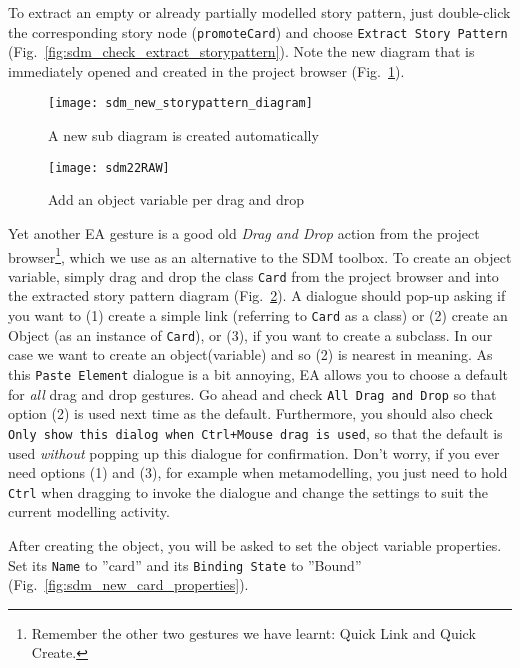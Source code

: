 To extract an empty or already partially modelled story pattern, just double-click the corresponding story node (\texttt{promoteCard}) and choose
\texttt{Extract Story Pattern} (Fig.~\ref{fig:sdm_check_extract_storypattern}). Note the new diagram that is immediately opened and created in the project
browser (Fig.~\ref{fig:sdm_new_sub_diagram}).

\begin{figure}[htbp]
\begin{center}
  \texttt{[image: sdm\_new\_storypattern\_diagram]}
  \caption{A new sub diagram is created automatically}
  \label{fig:sdm_new_sub_diagram}
\end{center}
\end{figure}

\begin{figure}[htbp]
\begin{center}
  \texttt{[image: sdm22RAW]}
  \caption{Add an object variable per drag and drop}
  \label{fig:sdm_check_bound_card}
\end{center}
\end{figure}

Yet another EA gesture is a good old \emph{Drag and Drop} action from the project browser\footnote{Remember the other two gestures we have learnt:
Quick Link and Quick Create.}, which we use as an alternative to the SDM toolbox. To create an object variable, simply drag and drop the class \texttt{Card}
from the project browser and into the extracted story pattern diagram (Fig.~\ref{fig:sdm_check_bound_card}).  A dialogue should pop-up asking if you want to (1)
create a simple link (referring to \texttt{Card} as a class) or (2) create an Object (as an instance of \texttt{Card}), or (3), if you want to create a
subclass. In our case we want to create an object(variable) and so (2) is nearest in meaning. As this \texttt{Paste Element} dialogue is a bit annoying, EA 
allows you to choose a default for \emph{all} drag and drop gestures. Go ahead and check \texttt{All Drag and Drop} so that option (2) is used next time as the
default.  Furthermore, you should also check \texttt{Only show this dialog when Ctrl+Mouse drag is used}, so that the default is used \emph{without} popping up
this dialogue for confirmation. Don't worry, if you ever need options (1) and (3), for example when metamodelling, you  just need to hold \texttt{Ctrl} when
dragging to invoke the dialogue and change  the settings to suit the current modelling activity.

After creating the object, you will be asked to set the object variable properties. Set its \texttt{Name} to ''card'' and its \texttt{Binding State} to
''Bound'' (Fig.~\ref{fig:sdm_new_card_properties}).

